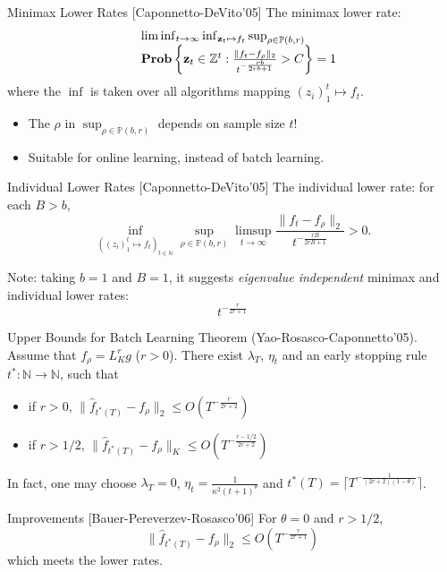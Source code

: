 \documentclass[pdf,slideColor,colorBG]{prosper}
\theoremstyle{theorem}
\theoremstyle{definition}
\theoremstyle{remark}
\newcommand{\DS}{\displaystyle}
\def\Z{{\mathbb Z}}        %
\def\P{{\mathbb P}}        %
\def\N{{\mathbb N}}
\def\z{{\mathbf z}}
\def\Prob{{\bf Prob}}
\def\la{{\lambda}}
\def\ka{{\kappa}}
\begin{document}
%
\begin{slide}{Minimax Lower Rates}
[Caponnetto-DeVito'05] The minimax lower rate:
\[
\begin{array}{rl}
& \liminf_{t\to \infty} \inf_{\z_t \mapsto f_t } \sup_{\rho\in \P(b,r)} \\
& \Prob \left\{\z_t \in \Z^t: \frac{\|f_t - f_\rho\|_2}{t^{-\frac{rb}{2rb+1}}} >C \right\} = 1
\end{array}
\]
where the $\inf$ is taken over all algorithms mapping $(z_i)_1^t\mapsto f_t$.

\medskip

\begin{itemize}
    \item The $\rho$ in $\sup_{\rho\in \P(b,r)}$ depends on sample size $t$!
    \item Suitable for online learning, instead of batch learning.
\end{itemize}
\end{slide}

%
\begin{slide}{Individual Lower Rates}
[Caponnetto-DeVito'05] The individual lower rate: for each $B>b$,
\[\inf_{((z_i)_1^t\mapsto f_t)_{t\in \N}} \sup_{\rho \in \P(b,r)} \limsup_{t\to \infty} \frac{\|f_t- f_\rho\|_2}{t^{-\frac{rB}{2rB+1}}} > 0. \]

\medskip

Note: taking $b=1$ and $B=1$, it suggests \emph{eigenvalue independent} minimax and individual lower rates:
$$t^{-\frac{r}{2r+1}} $$
\end{slide}

%
\begin{slide}{Upper Bounds for Batch Learning}
Theorem (Yao-Rosasco-Caponnetto'05). Assume that $f_\rho = L_K^r g$ ($r>0$). There exist $\la_T$, $\eta_t$ and an early stopping rule $t^\ast:\N\to \N$,
such that

\begin{itemize}
    \item if $r>0$, $\DS \|\hat{f}_{t^\ast(T)} - f_\rho \|_2 \leq O( T^{-\frac{r}{2r+2}}) $
    \item if $r>1/2$, $\DS \|\hat{f}_{t^\ast(T)} - f_\rho \|_K \leq O( T^{-\frac{r-1/2}{2r+2}})$
\end{itemize}
In fact, one may choose $\la_T=0$, $\eta_t = \frac{1}{\ka^2(t+1)^\theta}$ and $t^\ast(T)=\lceil T^{-\frac{1}{(2r+2)(1-\theta)}} \rceil$.
\end{slide}

%
\begin{slide}{Improvements}
[Bauer-Pereverzev-Rosasco'06] For $\theta=0$ and $r>1/2$,
$$\DS \|\hat{f}_{t^\ast(T)} - f_\rho \|_2 \leq O( T^{-\frac{r}{2r+1}})$$
which meets the lower rates.
\end{slide}
\end{document}
